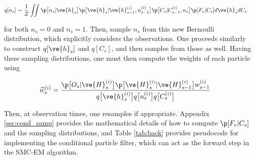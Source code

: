 \begin{align}
q[n_s] &\sim \frac{1}{Z} \iint  \p \big[ n_s | \ve{h}_s \big] \p \big[ \ve{h}_s | \ve{h}^{(i)}_{s-1}, n_{s-1}^{(i)} \big] \p \big[ C_s | C^{(i)}_{s-1}, n_s \big] \p[F_v|C_s] d\ve{h}_s dC_s
\end{align}

\noindent for both $n_s=0$ and $n_s=1$. Then, sample $n_s$ from this new Bernoulli distribution, which explicitly considers the observations.  One proceeds similarly to construct $q[\ve{h}_s]$ and $q[C_s]$, and then samples from those as well.  Having these sampling distributions, one must then compute the weights of each particle using

\begin{align} \label{eq:cond_w}
\widetilde{w}_s^{(i)} &= \frac{\p\big[O_s | \ve{H}_s^{(i)}\big]
\p\big[\ve{H}_s^{(i)} | \ve{H}_{s-1}^{(i)}\big] w_{s-1}^{(i)}}{q\big[\ve{h}_s^{(i)}\big] q\big[n_s^{(i)}\big] q\big[C_s^{(i)}\big]}
\end{align}

\noindent Then, at observation times, one resamples if appropriate.  Appendix \ref{sec:cond_samp} provides the mathematical details of how to compute $\p[F_v | C_s]$ and the sampling distributions, and Table \ref{tab:back} provides pseudocode for implementing the conditional particle filter, which can act as the forward step in the SMC-EM algorithm.

% 